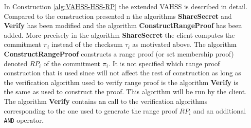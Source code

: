In Construction \ref{alg:VAHSS-HSS-RP} the extended VAHSS is described in detail. Compared to the construction presented n \cite{SumItUp} the algorithms \textbf{ShareSecret} and \textbf{Verify} has been modified and the algorithm \textbf{ConstructRangeProof} has been added. More precisely in the algorithm \textbf{ShareSecret} the client computes the commitment $\pi_i$ instead of the checksum $\tau_i$ as motivated above. The algorithm \textbf{ConstructRangeProof} constructs a range proof (or set membership proof) denoted $RP_i$ of the commitment $\pi_i$. It is not specified which range proof construction that is used since will not affect the rest of construction as long as the verification algorithm used to verify range proof is the algorithm \textbf{Verify} is the same as used to construct the proof. This algorithm will be run by the client. The algorithm \textbf{Verify} contains an call to the verification algorithms corresponding to the one used to generate the range proof $RP_i$ and an additional \texttt{AND} operator. 


